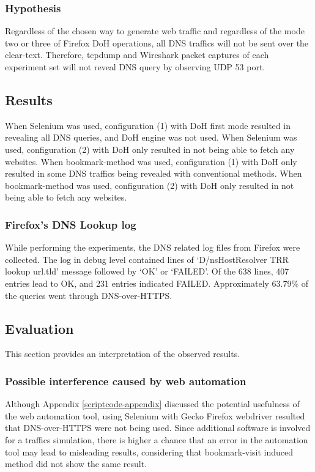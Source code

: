 \subsubsection{Hypothesis}
Regardless of the chosen way to generate web traffic and regardless of the mode two or three of Firefox DoH operations, all DNS traffics will not be sent over the clear-text. Therefore, tcpdump and Wireshark packet captures of each experiment set will not reveal DNS query by observing UDP 53 port.

\subsection{Results}
When Selenium was used, configuration (1) with DoH first mode resulted in revealing all DNS queries, and DoH engine was not used.
When Selenium was used, configuration (2) with DoH only resulted in not being able to fetch any websites.
When bookmark-method was used, configuration (1) with DoH only resulted in some DNS traffics being revealed with conventional methods.
When bookmark-method was used, configuration (2) with DoH only resulted in not being able to fetch any websites.

\subsubsection{Firefox's DNS Lookup log}
While performing the experiments, the DNS related log files from Firefox were collected.
The log in debug level contained lines of `D/nsHostResolver TRR lookup url.tld' message followed by `OK' or `FAILED'.
Of the 638 lines, 407 entries lead to OK, and  231 entries indicated FAILED.
Approximately 63.79\% of the queries went through DNS-over-HTTPS.

\subsection{Evaluation}
This section provides an interpretation of the observed results.

\subsubsection{Possible interference caused by web automation}
Although Appendix \ref{scriptcode-appendix} discussed the potential usefulness of the web automation tool, using Selenium with Gecko Firefox webdriver resulted that DNS-over-HTTPS were not being used.
Since additional software is involved for a traffics simulation, there is higher a chance that an error in the automation tool may lead to misleading results, considering that bookmark-visit induced method did not show the same result.

